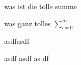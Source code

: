 \documentclass{article}
\begin{document}
\begin{flashcard}
\begin{question}
was ist die tolle summe
\end{question}

\begin{definition}
was ganz tolles $\sum_{i=0}^{\infty}$ 
\end{definition}

\end{flashcard}

asdfasdf

asdf
asdf
as
df
\end{document}
